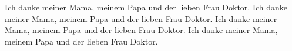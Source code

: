 Ich danke meiner Mama, meinem Papa und der lieben Frau Doktor.
Ich danke meiner Mama, meinem Papa und der lieben Frau Doktor.
Ich danke meiner Mama, meinem Papa und der lieben Frau Doktor.
Ich danke meiner Mama, meinem Papa und der lieben Frau Doktor.
